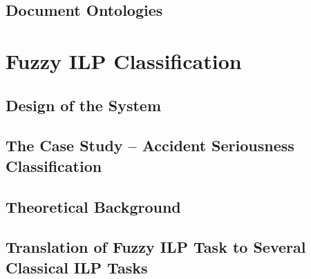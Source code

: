 \subsection{Document Ontologies}

\section{Fuzzy ILP Classification}

\subsection{Design of the System}

\subsection{The Case Study – Accident Seriousness Classification}

\subsection{Theoretical Background}

\subsection{Translation of Fuzzy ILP Task to Several Classical ILP Tasks}
